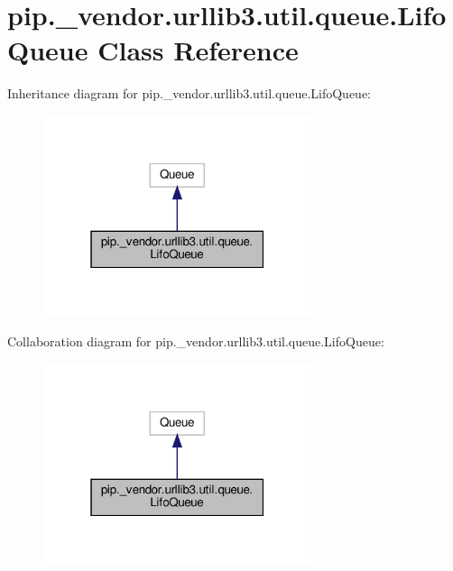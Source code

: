 \hypertarget{classpip_1_1__vendor_1_1urllib3_1_1util_1_1queue_1_1LifoQueue}{}\section{pip.\+\_\+vendor.\+urllib3.\+util.\+queue.\+Lifo\+Queue Class Reference}
\label{classpip_1_1__vendor_1_1urllib3_1_1util_1_1queue_1_1LifoQueue}


Inheritance diagram for pip.\+\_\+vendor.\+urllib3.\+util.\+queue.\+Lifo\+Queue\+:
\nopagebreak
\begin{figure}[H]
\begin{center}
\leavevmode
\includegraphics[width=223pt]{classpip_1_1__vendor_1_1urllib3_1_1util_1_1queue_1_1LifoQueue__inherit__graph}
\end{center}
\end{figure}


Collaboration diagram for pip.\+\_\+vendor.\+urllib3.\+util.\+queue.\+Lifo\+Queue\+:
\nopagebreak
\begin{figure}[H]
\begin{center}
\leavevmode
\includegraphics[width=223pt]{classpip_1_1__vendor_1_1urllib3_1_1util_1_1queue_1_1LifoQueue__coll__graph}
\end{center}
\end{figure}
